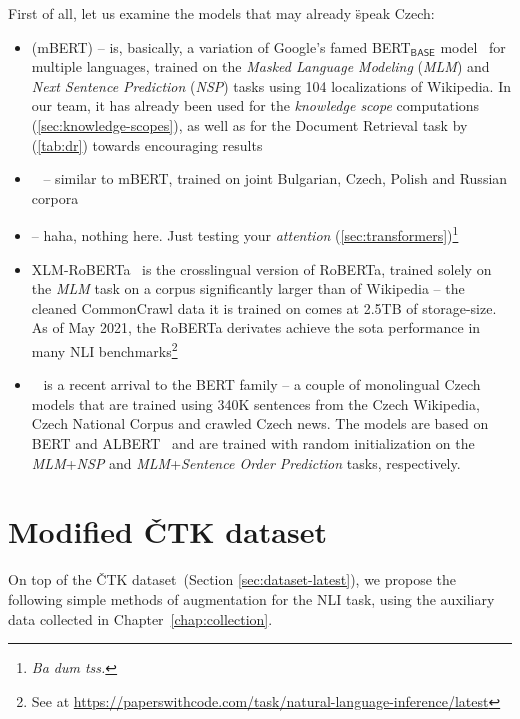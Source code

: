 First of all, let us examine the models that may already \"{speak} Czech: 
\begin{itemize} 
    \item {} ({\techbf mBERT}) -- is, basically, a variation of \textsf{Google}'s famed \textsf{BERT}$_\textsf{BASE}$ model~\cite{devlin2019bert} for multiple languages, trained on the \textit{Masked Language Modeling} (\textit{MLM}) and \textit{Next Sentence Prediction} (\textit{NSP}) tasks using 104 localizations of \textsf{Wikipedia}. In our team, it has already been used for the \textit{knowledge scope} computations (\ref{sec:knowledge-scopes}), as well as for the Document Retrieval task by~\cite{rypar,michal} (\ref{tab:dr}) towards encouraging results
    
    \item {}~\cite{slavicbert} -- similar to \textsf{mBERT}, trained on joint Bulgarian, Czech, Polish and Russian corpora
   
   \item {} -- haha, nothing here. Just testing your \textit{attention} (\ref{sec:transformers})\footnote{\textit{Ba dum tss.}}
   \item {\techbf XLM-RoBERTa}~\cite{xlm-roberta} is the crosslingual version of \textsf{RoBERTa}, trained solely on the \textit{MLM} task on a corpus significantly larger than of \textsf{Wikipedia} -- the cleaned \textsf{CommonCrawl} data it is trained on comes at 2.5TB of storage-size. As of May 2021, the \textsf{RoBERTa} derivates achieve the sota performance in many NLI benchmarks\footnote{See at \url{https://paperswithcode.com/task/natural-language-inference/latest}}
    \item {}~\cite{czert} is a recent arrival to the \textsf{BERT} family -- a couple of monolingual Czech models that are trained using 340K sentences from the Czech \textsf{Wikipedia}, \textsf{Czech National Corpus} and crawled Czech news. The models are based on \textsf{BERT} and \textsf{ALBERT}~\cite{albert} and are trained with random initialization on the \textit{MLM}+\textit{NSP} and \textit{MLM}+\textit{Sentence Order Prediction} tasks, respectively.
\end{itemize}
\section{Modified ČTK dataset}
\label{sec:modified-ctk}
On top of the \textsf{ČTK} dataset~(Section \ref{sec:dataset-latest}), we propose the following simple methods of augmentation for the NLI task, using the auxiliary data collected in Chapter~\ref{chap:collection}.

